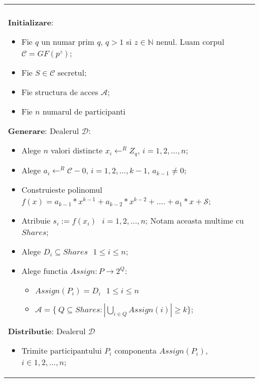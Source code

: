 \documentclass{llncs}
\begin{document}
\begin{figure*}[h!]

\begin{tabular}{|p{\textwidth}|}
\hline

\\
\hspace{.1in}
\textbf{Initializare}: 
	\begin{itemize}
		\item Fie $q$ un numar prim $q$, $q > 1$ si $z \in \mathbb{N}$ nenul. Luam corpul $\mathcal{C} = GF(p^z)$;
		\item Fie $S \in \mathcal{C}$ secretul;
		\item Fie structura de acces $\mathcal{A}$;
		\item Fie $n$ numarul de participanti
	\end{itemize}

\medskip

\hspace{.1in}
\textbf{Generare}: Dealerul $\mathcal{D}$:
	\begin{itemize}
		\setlength{\itemsep}{5pt}
		\item Alege $n$ valori distincte $x_i \leftarrow^R Z_q \text{, }i = 1,2,\dots,n$;
		\item Alege $a_{i} \leftarrow^R \mathcal{C} - {0} \text{, }i = 1,2,\dots,{k - 1}$, $a_{k-1} \neq 0$;
		\item Construieste polinomul $f(x) = a_{k - 1} * x ^ {k-1} + a_{k-2} * x ^ {k - 2} + .... + a_1 * x + \mathcal{S}$;
		\item Atribuie $s_i := f(x_i) \text{ } i = 1,2,\dots,n$; Notam aceasta multime cu $Shares$;
		\item Alege $D_i \subseteq Shares \text{ } 1 \leq i \leq n$;
		\item Alege functia $Assign: P \rightarrow 2^Q$:
			\begin{itemize}
				\item $Assign(P_i) = D_i \text{ } 1 \leq i \leq n$
				\item $\mathcal{A} = \{ \ Q \subseteq Shares: |\underset{i \in Q}{{\bigcup}} Assign(i)| \geq k \}$;
			\end{itemize}
	\end{itemize}
\medskip

\hspace{.1in}
\textbf{Distributie}: Dealerul $\mathcal{D}$
	\begin{itemize}
		\item Trimite participantului $P_i$ componenta $Assign(P_i)$, $i \in 1,2,\dots,n$;
	\end{itemize}


\end{tabular}
\end{figure*}
\end{document}
